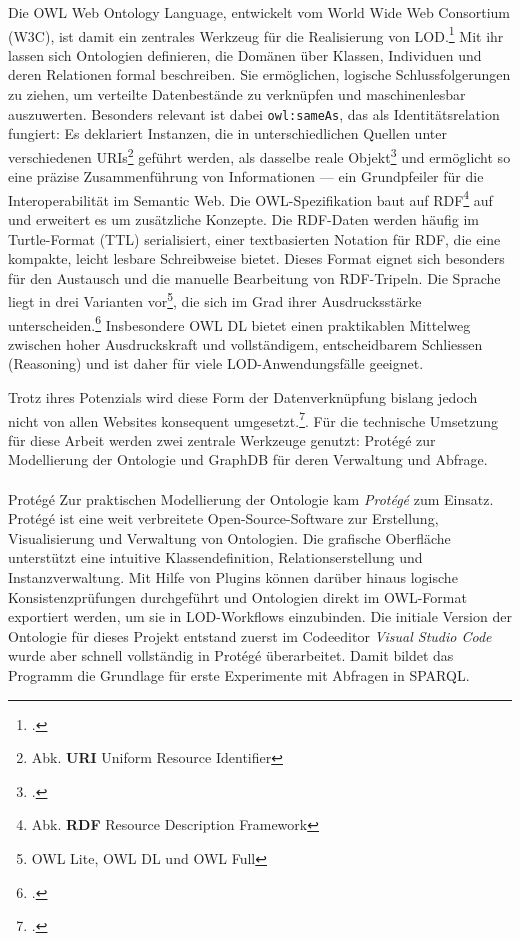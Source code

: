 \documentclass[12pt, a4paper, ngerman, bidi=default]{article}
\makeatletter
\let\cite\footcite
\let\oldparagraph\paragraph%
\renewcommand{\paragraph}{
    \@ifstar%
      \xxxParagraphStar%
      \xxxParagraphNoStar%
 }
\newcommand{\xxxParagraphStar}[1]{\oldparagraph*{#1}\mbox{}}
\newcommand{\xxxParagraphNoStar}[1]{\oldparagraph{#1}\mbox{}}
\makeatother
\begin{document}
Die OWL Web Ontology Language, entwickelt vom World Wide Web Consortium (W3C), ist damit ein zentrales Werkzeug für die Realisierung von 
LOD.\cite[ vgl.][]{smith_owl_2004} 
Mit ihr lassen sich Ontologien definieren, die Domänen über Klassen, Individuen und deren Relationen formal beschreiben. 
Sie ermöglichen, logische Schlussfolgerungen zu ziehen, um verteilte Datenbestände zu verknüpfen und maschinenlesbar auszuwerten.
Besonders relevant ist dabei \texttt{owl:sameAs}, das als Identitätsrelation fungiert: 
Es deklariert Instanzen, die in unterschiedlichen Quellen unter verschiedenen URIs\footnote{Abk. \textbf{URI}\: Uniform Resource Identifier} geführt werden, 
als dasselbe reale Objekt\cite[ vgl.][2.3. Data Aggregation and Privacy]{smith_owl_2004}
und ermöglicht so eine präzise Zusammenführung von Informationen — ein Grundpfeiler für die Interoperabilität im Semantic Web.
Die OWL-Spezifikation baut auf RDF\footnote{Abk. \textbf{RDF}\; Resource Description Framework} auf und erweitert es um zusätzliche Konzepte.
Die RDF-Daten werden häufig im Turtle-Format (TTL) serialisiert, einer textbasierten Notation für RDF, die eine kompakte, leicht lesbare Schreibweise bietet.
Dieses Format eignet sich besonders für den Austausch und die manuelle Bearbeitung von RDF-Tripeln.
Die Sprache liegt in drei Varianten vor\footnote{OWL Lite, OWL DL und OWL Full}, die sich im Grad ihrer Ausdrucksstärke 
unterscheiden.\cite[ vgl.][1.1. The Species of OWL.]{smith_owl_2004}
Insbesondere OWL DL bietet einen praktikablen Mittelweg zwischen hoher Ausdruckskraft und vollständigem, entscheidbarem Schliessen (Reasoning) 
und ist daher für viele LOD-Anwendungsfälle geeignet.

Trotz ihres Potenzials wird diese Form der Datenverknüpfung bislang jedoch nicht von allen Websites konsequent 
umgesetzt.\cite[ vgl.][S. 14]{garoufallou_metadata_2020}. Für die technische 
Umsetzung für diese Arbeit werden zwei zentrale Werkzeuge genutzt: Protégé zur Modellierung der Ontologie und GraphDB für deren Verwaltung und Abfrage.

\paragraph{Protégé} Zur praktischen Modellierung der Ontologie kam \textit{Protégé} zum Einsatz. 
Protégé ist eine weit verbreitete Open-Source-Software zur Erstellung, Visualisierung und Verwaltung von Ontologien.
Die grafische Oberfläche unterstützt eine intuitive Klassendefinition, 
Relationserstellung und Instanzverwaltung. 
Mit Hilfe von Plugins können darüber hinaus logische Konsistenzprüfungen durchgeführt und 
Ontologien direkt im OWL-Format exportiert werden, um sie in LOD-Workflows einzubinden.
Die initiale Version der Ontologie für dieses Projekt entstand zuerst im Codeeditor \textit{Visual Studio Code} wurde aber schnell vollständig in Protégé überarbeitet.
Damit bildet das Programm die Grundlage für erste Experimente mit Abfragen in SPARQL.%
\end{document}
